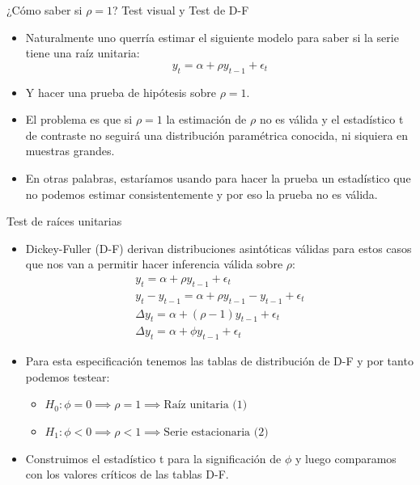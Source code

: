 \documentclass{beamer}
\begin{document}
\begin{frame}{¿Cómo saber si $\rho = 1$? Test visual y Test de D-F}
    \begin{itemize}
        \item Naturalmente uno querría estimar el siguiente modelo para saber si la serie tiene una raíz unitaria:
        \[
        y_t = \alpha + \rho y_{t-1} + \epsilon_t
        \]
        \item Y hacer una prueba de hipótesis sobre $\rho = 1$.
        \item El problema es que si $\rho = 1$ la estimación de $\rho$ no es válida y el estadístico t de contraste no seguirá una distribución paramétrica conocida, ni siquiera en muestras grandes.
        \item En otras palabras, estaríamos usando para hacer la prueba un estadístico que no podemos estimar consistentemente y por eso la prueba no es válida.
    \end{itemize}
\end{frame}
\begin{frame}{Test de raíces unitarias}
    \begin{itemize}
        \item Dickey-Fuller (D-F) derivan distribuciones asintóticas válidas para estos casos que nos van a permitir hacer inferencia válida sobre $\rho$:
        \begin{eqnarray}
 y_t = \alpha + \rho y_{t-1} + \epsilon_t\\
 y_t - y_{t-1} = \alpha + \rho y_{t-1} - y_{t-1} + \epsilon_t\\
  \Delta y_t = \alpha + (\rho - 1) y_{t-1} + \epsilon_t\\
   \Delta y_t = \alpha + \phi y_{t-1} + \epsilon_t
        \end{eqnarray}

   
        \item Para esta especificación tenemos las tablas de distribución de D-F y por tanto podemos testear:
        \begin{itemize}
            \item $H_0: \phi = 0 \implies \rho = 1 \implies \text{Raíz unitaria (1)}$
            \item $H_1: \phi < 0 \implies \rho < 1 \implies \text{Serie estacionaria (2)}$
        \end{itemize}
        \item Construimos el estadístico t para la significación de $\phi$ y luego comparamos con los valores críticos de las tablas D-F.
    \end{itemize}
\end{frame}
\end{document}
